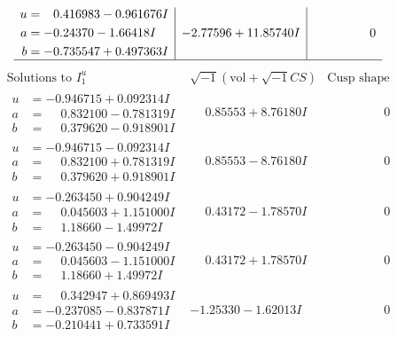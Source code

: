 \documentclass[1p]{elsarticle_modified}
\theoremstyle{definition}
\newcommand{\I}{\sqrt{-1}}
\begin{document}
$$\begin{array}{c|c|c}
\begin{aligned}
u &= \phantom{-}0.416983 - 0.961676 I \\
a &= -0.24370 - 1.66418 I \\
b &= -0.735547 + 0.497363 I\end{aligned}
 & -2.77596 + 11.85740 I & \phantom{-0.000000 } 0\\
 \hline 
 \end{array}$$\newpage$$\begin{array}{c|c|c}  
\text{Solutions to }I^u_{1}& \I (\text{vol} + \sqrt{-1}CS) & \text{Cusp shape}\\
 \hline 
\begin{aligned}
u &= -0.946715 + 0.092314 I \\
a &= \phantom{-}0.832100 - 0.781319 I \\
b &= \phantom{-}0.379620 - 0.918901 I\end{aligned}
 & \phantom{-}0.85553 + 8.76180 I & \phantom{-0.000000 } 0 \\ \hline\begin{aligned}
u &= -0.946715 - 0.092314 I \\
a &= \phantom{-}0.832100 + 0.781319 I \\
b &= \phantom{-}0.379620 + 0.918901 I\end{aligned}
 & \phantom{-}0.85553 - 8.76180 I & \phantom{-0.000000 } 0 \\ \hline\begin{aligned}
u &= -0.263450 + 0.904249 I \\
a &= \phantom{-}0.045603 + 1.151000 I \\
b &= \phantom{-}1.18660 - 1.49972 I\end{aligned}
 & \phantom{-}0.43172 - 1.78570 I & \phantom{-0.000000 } 0 \\ \hline\begin{aligned}
u &= -0.263450 - 0.904249 I \\
a &= \phantom{-}0.045603 - 1.151000 I \\
b &= \phantom{-}1.18660 + 1.49972 I\end{aligned}
 & \phantom{-}0.43172 + 1.78570 I & \phantom{-0.000000 } 0 \\ \hline\begin{aligned}
u &= \phantom{-}0.342947 + 0.869493 I \\
a &= -0.237085 - 0.837871 I \\
b &= -0.210441 + 0.733591 I\end{aligned}
 & -1.25330 - 1.62013 I & \phantom{-0.000000 } 0 \\ \hline\begin{aligned}

\end{aligned}
\end{array}$$
\end{document}
